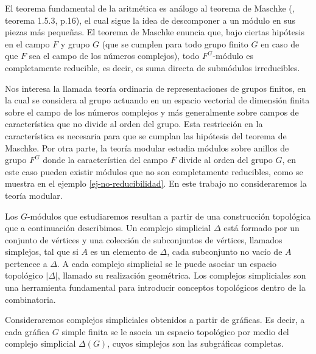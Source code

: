\documentclass[12pt]{book}
\theoremstyle{definition}
\newcounter{in}
\newcounter{ini}
\begin{document}
El teorema fundamental de la aritmética es análogo al teorema de
Maschke (\cite{sagan2001symmetric}, teorema 1.5.3, p.16), el cual
sigue la idea de descomponer a un módulo en sus piezas más
pequeñas. El teorema de Maschke enuncia que, bajo ciertas hipótesis en
el campo $F$ y grupo $G$ (que se cumplen para todo grupo finito $G$
en caso de que $F$ sea el campo de los números complejos), todo $F^{G}$-módulo es completamente reducible,
es decir, es suma directa de submódulos irreducibles.

Nos interesa la llamada teoría ordinaria de representaciones de grupos finitos,
en la cual se considera al grupo actuando en un espacio vectorial de dimensión finita sobre el campo de
los números complejos y más generalmente sobre campos de
característica que no divide al orden del grupo. Esta restricción en
la característica es necesaria para que se cumplan las hipótesis del teorema de Maschke.
Por otra parte, la teoría modular estudia módulos sobre anillos de
grupo $F^{G}$ donde la
característica del campo $F$ divide al orden del grupo $G$, en este caso pueden
existir módulos que no son completamente reducibles, como se
muestra en el ejemplo \ref{ej-no-reducibilidad}. En este trabajo no consideraremos la teoría
modular.%

Los $G$-módulos que estudiaremos resultan a partir de una construcción
topológica que a continuación describimos. Un complejo simplicial
$\Delta$ está formado por un conjunto de vértices y una colección de
subconjuntos de vértices, llamados simplejos, tal que si $A$ es un
elemento de $\Delta$, cada subconjunto no vacío de $A$ pertenece a
$\Delta$. A cada complejo simplicial se le puede asociar un espacio
topológico $|\Delta|$, llamado su realización geométrica. Los
complejos simpliciales son una herramienta fundamental para introducir
conceptos topológicos dentro de la combinatoria.

Consideraremos complejos simpliciales obtenidos a partir de
gráficas. Es decir, a cada gráfica $G$ simple finita se le asocia un
espacio topológico por medio del complejo simplicial $\Delta(G)$, cuyos
simplejos son las subgráficas completas. 
\end{document}
